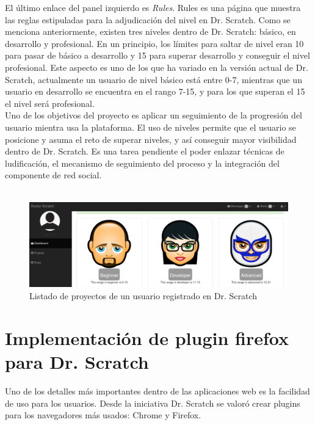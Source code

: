 \documentclass[a4paper, 12pt]{book}
\begin{document}
El último enlace del panel izquierdo es \emph{Rules}. Rules es una página que muestra
las reglas estipuladas para la adjudicación del nivel en Dr. Scratch. Como se menciona
anteriormente, existen tres niveles dentro de Dr. Scratch: básico, en desarrollo y 
profesional. En un principio, los límites para saltar de nivel eran 10 para pasar de 
básico a desarrollo y 15 para superar desarrollo y conseguir el nivel profesional. Este
aspecto es uno de los que ha variado en la versión actual de Dr. Scratch, actualmente
un usuario de nivel básico está entre 0-7, mientras que un usuario en desarrollo se
encuentra en el rango 7-15, y para los que superan el 15 el nivel será profesional. \\

Uno de los objetivos del proyecto es aplicar un seguimiento de la progresión del 
usuario mientra usa la plataforma. El uso de niveles permite que el usuario se posicione
y asuma el reto de superar niveles, y así conseguir mayor visibilidad dentro de Dr. 
Scratch. Es una tarea pendiente el poder enlazar técnicas de ludificación, el mecanismo
de seguimiento del proceso y la integración del componente de red social. \\ \\



\begin{figure}
	\graphicspath{{img/}}
  \includegraphics[bb=0 0 800 600, width=13cm, keepaspectratio]{niveles.png}
	\caption{Listado de proyectos de un usuario registrado en Dr. Scratch}
  \label{figura:foro_hilos}
\end{figure}


\section{Implementación de plugin firefox para Dr. Scratch}
\label{sec:servidor}

Uno de los detalles más importantes dentro de las aplicaciones web es la facilidad de 
uso para los usuarios. Desde la iniciativa Dr. Scratch se valoró crear plugins para
los navegadores más usados: Chrome y Firefox. \\
\end{document}
